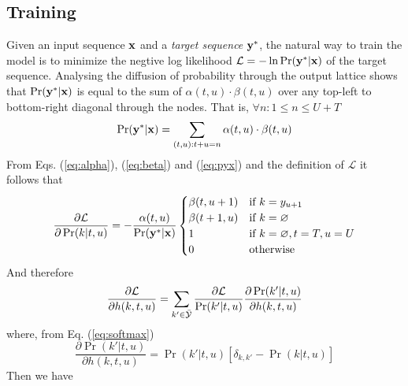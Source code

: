 \documentclass{article}
\begin{document}
\subsection{Training}
Given an input sequence $\mathbf{x}$ and a \textit{target sequence} $\mathbf{y}^*$, the natural way to train the model is to minimize the negtive log likelihood $\mathcal{L} = -\ln \Pr(\mathbf{y}^* | \mathbf{x})$ of the target sequence.
Analysing the diffusion of probability through the output lattice shows that $\Pr(\mathbf{y}^* | \mathbf{x})$ is equal to the sum of $\alpha(t, u) \cdot \beta(t, u)$ over any top-left to bottom-right diagonal through the nodes. That is,
$\forall n : 1 \leq n \leq U + T$
\begin{equation} \label{eq:pyx}
    \Pr(\mathbf{y}^* | \mathbf{x}) = \sum_{(t,u): t+u=n} \alpha(t, u) \cdot \beta(t, u)
\end{equation}
From Eqs. (\ref{eq:alpha}), (\ref{eq:beta}) and (\ref{eq:pyx}) and the definition of $\mathcal{L}$ it follows that
\begin{equation} \label{eq:grad_pr}
    \frac{\partial \mathcal{L}}{\partial \Pr(k|t,u)} = -\frac{\alpha(t,u)}{\Pr(\mathbf{y}^*|\mathbf{x})}
    \begin{cases}
        \beta(t, u+1) & \text{if } k = y_{u+1} \\
        \beta(t+1, u) & \text{if } k = \varnothing \\
        1 & \text{if } k = \varnothing, t = T, u = U \\
        0 & \text{otherwise}
    \end{cases}
\end{equation}
And therefore
\begin{equation}
    \begin{split}
        \frac{\partial \mathcal L}{\partial h(k,t,u)} = \sum_{k' \in \bar{\mathcal{Y}}} \frac{\partial \mathcal L}{\Pr(k'|t,u)} \frac{\partial \Pr(k'|t,u)}{\partial h(k,t,u)}
    \end{split}
\end{equation}
where, from Eq. (\ref{eq:softmax})
\begin{equation}
    \frac{\partial \Pr(k'|t,u)}{\partial h(k,t,u)} = \Pr(k'|t,u)[\delta_{k,k'} - \Pr(k|t,u)]
\end{equation}
Then we have
\end{document}

